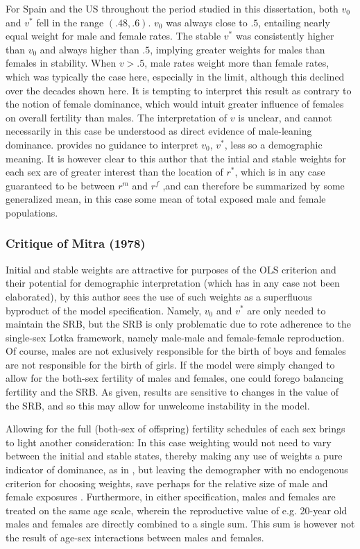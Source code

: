 For Spain and the US throughout the period studied in this dissertation, both
$v_0$ and $v^\ast$ fell in the range $(.48,.6)$. $v_0$ was always
close to $.5$, entailing nearly equal weight for male and female rates.
The stable $v^\ast$ was consistently higher than $v_0$ and always higher than
$.5$, implying greater weights for males than females in stability. When $v > .5$, male rates weight
more than female rates, which was typically the case here, especially in the
limit, although this declined over the decades shown here. It is
tempting to interpret this result as contrary to the notion of female dominance,
which would intuit greater influence of females on overall fertility than
males. The interpretation of $v$ is unclear, and cannot necessarily in this case
be understood as direct evidence of male-leaning dominance.
\citet{mitra1978derivation} provides no guidance to interpret $v_0$, $v^\ast$,
less so a demographic meaning. It is however clear to this author that
the intial and stable weights for each sex are of greater interest
than the location of $r^\ast$, which is in any case guaranteed to be between
$r^m$ and $r^f$ ,and can therefore be summarized by some generalized mean, in
this case some mean of total exposed male and female populations.

\subsubsection{Critique of Mitra (1978)}
Initial and stable weights are attractive for purposes of the OLS
criterion and their potential for demographic interpretation (which has in any
case not been elaborated), by this author sees the use of such weights as
a superfluous byproduct of the model specification. Namely, $v_0$ and $v^\ast$
are only needed to maintain the SRB, but the SRB is only problematic due to
rote adherence to the single-sex Lotka framework, namely male-male and
female-female reproduction. Of course, males are not exlusively responsible for
the birth of boys and females are not responsible for the birth of girls. If the
model were simply changed to allow for the both-sex fertility of males and
females, one could forego balancing fertility and the SRB. As given, results are
sensitive to changes in the value of the SRB, and so this may allow for
unwelcome instability in the model.

Allowing for the full (both-sex of offspring) fertility schedules of each sex
brings to light another consideration: In this case weighting would not need to
vary between the initial and stable states, thereby making any use of weights a pure
indicator of dominance, as in \citet{goodman1967age}, but leaving the
demographer with no endogenous criterion for choosing weights, save perhaps for
the relative size of male and female exposures \citep{mitra1976effect}.
Furthermore, in either specification, males and females are treated on the same age scale, wherein the reproductive value of e.g. 20-year old males and females are
directly combined to a single sum. This sum is however not the result of age-sex
interactions between males and females.

